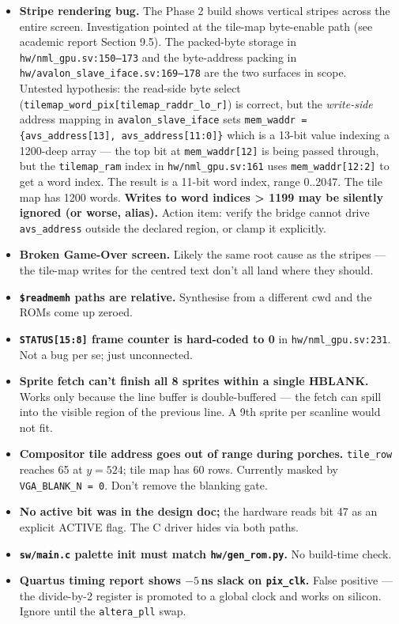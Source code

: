 \documentclass[11pt,letterpaper]{article}
\begin{document}
\begin{itemize}[leftmargin=*]
  \item \textbf{Stripe rendering bug.} The Phase 2 build shows vertical
    stripes across the entire screen. Investigation pointed at the
    tile-map byte-enable path (see academic report Section 9.5). The packed-byte
    storage in \texttt{hw/nml\_gpu.sv:150--173} and the byte-address
    packing in \texttt{hw/avalon\_slave\_iface.sv:169--178} are the two
    surfaces in scope.\\
    Untested hypothesis: the read-side byte select
    (\texttt{tilemap\_word\_pix[tilemap\_raddr\_lo\_r]}) is correct, but
    the \emph{write-side} address mapping in
    \texttt{avalon\_slave\_iface} sets
    \texttt{mem\_waddr = \{avs\_address[13], avs\_address[11:0]\}} which
    is a 13-bit value indexing a 1200-deep array --- the top bit at
    \texttt{mem\_waddr[12]} is being passed through, but the
    \texttt{tilemap\_ram} index in \texttt{hw/nml\_gpu.sv:161} uses
    \texttt{mem\_waddr[12:2]} to get a word index. The result is a
    11-bit word index, range 0..2047. The tile map has 1200 words.
    \textbf{Writes to word indices > 1199 may be silently ignored (or
    worse, alias).} Action item: verify the bridge cannot drive
    \texttt{avs\_address} outside the declared region, or clamp it
    explicitly.
  \item \textbf{Broken Game-Over screen.} Likely the same root cause as
    the stripes --- the tile-map writes for the centred text don't all
    land where they should.
  \item \textbf{\texttt{\$readmemh} paths are relative.} Synthesise from a
    different cwd and the ROMs come up zeroed.
  \item \textbf{\texttt{STATUS[15:8]} frame counter is hard-coded to 0} in
    \texttt{hw/nml\_gpu.sv:231}. Not a bug per se; just unconnected.
  \item \textbf{Sprite fetch can't finish all 8 sprites within a single
    HBLANK.} Works only because the line buffer is double-buffered ---
    the fetch can spill into the visible region of the previous line. A
    9th sprite per scanline would not fit.
  \item \textbf{Compositor tile address goes out of range during
    porches.} \texttt{tile\_row} reaches 65 at $y = 524$; tile map has 60
    rows. Currently masked by \texttt{VGA\_BLANK\_N = 0}. Don't remove
    the blanking gate.
  \item \textbf{No active bit was in the design doc;} the hardware reads
    bit 47 as an explicit ACTIVE flag. The C driver hides via both
    paths.
  \item \textbf{\texttt{sw/main.c} palette init must match
    \texttt{hw/gen\_rom.py}.} No build-time check.
  \item \textbf{Quartus timing report shows $-5$\,ns slack on
    \texttt{pix\_clk}.} False positive --- the divide-by-2 register is
    promoted to a global clock and works on silicon. Ignore until the
    \texttt{altera\_pll} swap.
\end{itemize}
\end{document}
